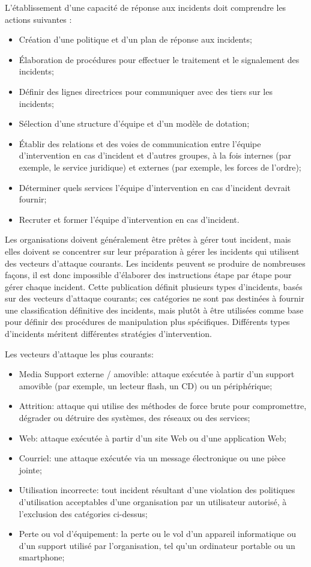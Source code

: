 L'établissement d'une capacité de réponse aux incidents doit comprendre les actions suivantes :

\begin{itemize}
  \item Création d'une politique et d'un plan de réponse aux incidents;
  \item  Élaboration de procédures pour effectuer le traitement et le signalement des incidents;
  \item Définir des lignes directrices pour communiquer avec des tiers sur les incidents;
   \item Sélection d'une structure d'équipe et d'un modèle de dotation;
  \item  Établir des relations et des voies de communication entre l'équipe d'intervention en cas d'incident et d'autres groupes, à la fois internes (par exemple, le service juridique) et externes (par exemple, les forces de l'ordre);
  \item Déterminer quels services l'équipe d'intervention en cas d'incident devrait fournir;
  \item Recruter et former l'équipe d'intervention en cas d'incident.
\end{itemize}


Les organisations doivent généralement être prêtes à gérer tout incident, mais elles doivent se concentrer sur leur préparation à gérer les incidents qui utilisent des vecteurs d'attaque courants.
Les incidents peuvent se produire de nombreuses façons, il est donc impossible d'élaborer des instructions étape par étape pour gérer chaque incident. Cette publication définit plusieurs types d'incidents, basés sur des vecteurs d'attaque courants; ces catégories ne sont pas destinées à fournir une classification définitive des incidents, mais plutôt à être utilisées comme base pour définir des procédures de manipulation plus spécifiques. Différents types d'incidents méritent différentes stratégies d'intervention. 

Les vecteurs d'attaque les plus courants:

\begin{itemize}
  \item Media Support externe / amovible: attaque exécutée à partir d'un support amovible (par exemple, un lecteur flash, un CD) ou un périphérique;
  \item Attrition: attaque qui utilise des méthodes de force brute pour compromettre, dégrader ou détruire des systèmes, des réseaux ou des services;
  \item Web: attaque exécutée à partir d'un site Web ou d'une application Web;
  \item Courriel: une attaque exécutée via un message électronique ou une pièce jointe;
  \item Utilisation incorrecte: tout incident résultant d'une violation des politiques d'utilisation acceptables d'une organisation par un utilisateur autorisé, à l'exclusion des catégories ci-dessus;
  \item  Perte ou vol d'équipement: la perte ou le vol d'un appareil informatique ou d'un support utilisé par l'organisation, tel qu'un ordinateur portable ou un smartphone;
\end{itemize}


